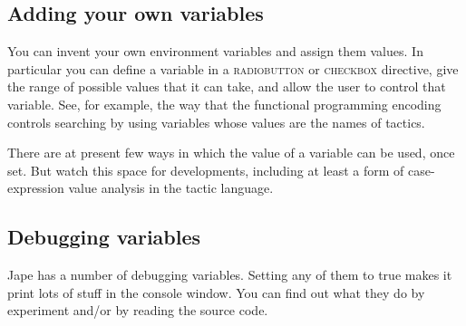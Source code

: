 \subsection{Adding your own variables}


You can invent your own environment variables and assign them values. In particular you can define a variable in a \textsc{radiobutton} or \textsc{checkbox} directive, give the range of possible values that it can take, and allow the user to control that variable. See, for example, the way that the functional programming encoding controls searching by using variables whose values are the names of tactics.


There are at present few ways in which the value of a variable can be used, once set. But watch this space for developments, including at least a form of case-expression value analysis in the tactic language.


\subsection{Debugging variables}


Jape has a number of debugging variables. Setting any of them to true makes it print lots of stuff in the console window. You can find out what they do by experiment and/or by reading the source code.

 